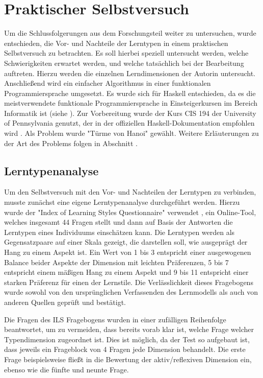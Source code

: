 \clearpage
\section{Praktischer Selbstversuch}
\label{sec:practice}

Um die Schlussfolgerungen aus dem Forschungsteil weiter zu untersuchen, wurde entschieden, die Vor- und Nachteile der Lerntypen in einem praktischen Selbstversuch zu betrachten.
Es soll hierbei speziell untersucht werden, welche Schwierigkeiten erwartet werden, und welche tatsächlich bei der Bearbeitung auftreten.
Hierzu werden die einzelnen Lerndimensionen der Autorin untersucht. Anschließend wird ein einfacher Algorithmus in einer funktionalen Programmiersprache umgesetzt. Es wurde sich für Haskell entschieden, da es die meistverwendete funktionale Programmiersprache in Einsteigerkursen im Bereich Informatik ist (siehe ).
Zur Vorbereitung wurde der Kurs CIS 194 \cite{cis194} der University of Pennsylvania genutzt, der in der offiziellen Haskell-Dokumentation empfohlen wird \cite{haskelldoc}.
Als Problem wurde "Türme von Hanoi" gewählt. Weitere Erläuterungen zu der Art des Problems folgen in Abschnitt .

\subsection{Lerntypenanalyse}
Um den Selbstversuch mit den Vor- und Nachteilen der Lerntypen zu verbinden, musste zunächst eine eigene Lerntypenanalyse durchgeführt werden.
Hierzu wurde der "Index of Learning Styles Questionnaire" verwendet \cite{ils_questionnaire}, ein Online-Tool, welches insgesamt 44 Fragen stellt und dann auf Basis der Antworten die Lerntypen eines Individuums einschätzen kann. Die Lerntypen werden als Gegensatzpaare auf einer Skala gezeigt, die darstellen soll, wie ausgeprägt der Hang zu einem Aspekt ist. Ein Wert von 1 bis 3 entspricht einer ausgewogenen Balance beider Aspekte der Dimension mit leichten Präferenzen, 5 bis 7 entspricht einem mäßigen Hang zu einem Aspekt und 9 bis 11 entspricht einer starken Präferenz für einen der Lernstile.
Die Verlässlichkeit dieses Fragebogens wurde sowohl von den ursprünglichen Verfassenden des Lernmodells \cite{felder2005} als auch von anderen Quellen \cite{zywno} geprüft und bestätigt.

Die Fragen des ILS Fragebogens wurden in einer zufälligen Reihenfolge beantwortet, um zu vermeiden, dass bereits vorab klar ist, welche Frage welcher Typendimension zugeordnet ist. Dies ist möglich, da der Test so aufgebaut ist, dass jeweils ein Frageblock von 4 Fragen jede Dimension behandelt. Die erste Frage beispielsweise fließt in die Bewertung der aktiv/reflexiven Dimension ein, ebenso wie die fünfte und neunte Frage.


